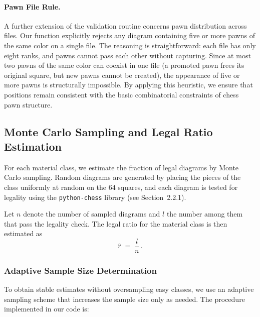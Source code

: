 \documentclass[12pt]{article}
\begin{document}
\paragraph{Pawn File Rule.}
A further extension of the validation routine concerns pawn distribution across files. 
Our function explicitly rejects any diagram containing five or more pawns of the same color on a single file. 
The reasoning is straightforward: each file has only eight ranks, and pawns cannot pass each other without capturing. 
Since at most two pawns of the same color can coexist in one file (a promoted pawn frees its original square, but new pawns cannot be created), the appearance of five or more pawns is structurally impossible. 
By applying this heuristic, we ensure that positions remain consistent with the basic combinatorial constraints of chess pawn structure.

\subsection{Monte Carlo Sampling and Legal Ratio Estimation}

For each material class, we estimate the fraction of legal diagrams by Monte Carlo sampling. Random diagrams are generated by placing the pieces of the class uniformly at random on the $64$ squares, and each diagram is tested for legality using the \texttt{python-chess} library (see Section~2.2.1).

Let $n$ denote the number of sampled diagrams and $l$ the number among them that pass the legality check. The legal ratio for the material class is then estimated as
\begin{equation}
\hat{r} \;=\; \frac{l}{n}\, .
\end{equation}

\subsubsection{Adaptive Sample Size Determination}

To obtain stable estimates without oversampling easy classes, we use an adaptive sampling scheme that increases the sample size only as needed. The procedure implemented in our code is:
\end{document}
